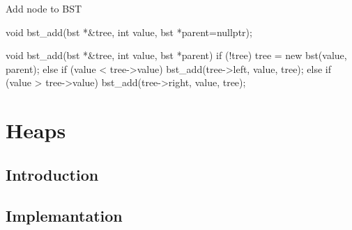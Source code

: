 \documentclass{beamer}
\begin{document}
\begin{frame}[fragile]{Add node to BST}
\begin{cppcode}
void bst_add(bst *&tree, int value, bst *parent=nullptr);


void bst_add(bst *&tree, int value, bst *parent) {
    if (!tree)
        tree = new bst(value, parent);
    else if (value < tree->value)
        bst_add(tree->left, value, tree);
    else if (value > tree->value)
        bst_add(tree->right, value, tree);
}
\end{cppcode}
\end{frame}


\section{Heaps}

\subsection{Introduction}

\subsection{Implemantation}
\end{document}
